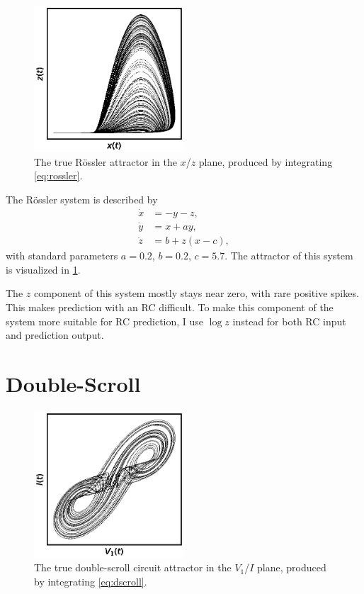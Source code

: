 \begin{figure}
  \includegraphics[width=0.5\textwidth]{figures/rossler}
  \caption{The true R{\"{o}}ssler attractor in the $x$/$z$ plane, produced by integrating \cref{eq:rossler}.}%
  \label{fig:rossler}
\end{figure}

The R{\"{o}}ssler system is described by
\begin{equation}
  \begin{aligned}
    \dot{x} &= - y - z, \\
    \dot{y} &= x + a y, \\
    \dot{z} &= b + z (x - c),
  \end{aligned}
  \label{eq:rossler}
\end{equation}
with standard parameters $a = 0.2$, $b = 0.2$, $c =
5.7$.\cite{rossler1976} The attractor of this system is visualized in
\cref{fig:rossler}.

The $z$ component of this system mostly stays near zero, with rare
positive spikes. This makes prediction with an RC difficult. To make
this component of the system more suitable for RC prediction, I use
$\log z$ instead for both RC input and prediction output.

\section{Double-Scroll}

\begin{figure}
  \includegraphics[width=0.5\textwidth]{figures/dscroll}
  \caption{The true double-scroll circuit attractor in the $V_1$/$I$ plane, produced by integrating \cref{eq:dscroll}.}%
  \label{fig:dscroll}
\end{figure}

